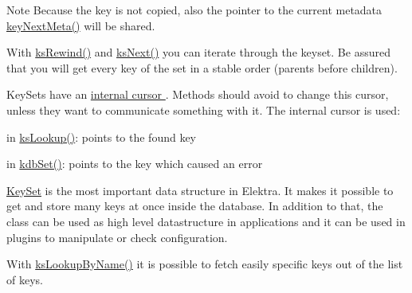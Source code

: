 \begin{DoxyNote}{Note}
Because the key is not copied, also the pointer to the current metadata \hyperlink{group__keymeta_ga4c88342f580a4291455a801af71ce048}{key\+Next\+Meta()} will be shared.
\end{DoxyNote}
With \hyperlink{group__keyset_gabe793ff51f1728e3429c84a8a9086b70}{ks\+Rewind()} and \hyperlink{group__keyset_ga317321c9065b5a4b3e33fe1c399bcec9}{ks\+Next()} you can iterate through the keyset. Be assured that you will get every key of the set in a stable order (parents before children).

Key\+Sets have an \hyperlink{group__keyset_ga4287b9416912c5f2ab9c195cb74fb094}{internal cursor }. Methods should avoid to change this cursor, unless they want to communicate something with it. The internal cursor is used\+:


\begin{DoxyItemize}
\item in \hyperlink{group__keyset_gaa34fc43a081e6b01e4120daa6c112004}{ks\+Lookup()}\+: points to the found key
\item in \hyperlink{group__kdb_ga11436b058408f83d303ca5e996832bcf}{kdb\+Set()}\+: points to the key which caused an error
\end{DoxyItemize}

\hyperlink{classkdb_1_1KeySet}{Key\+Set} is the most important data structure in Elektra. It makes it possible to get and store many keys at once inside the database. In addition to that, the class can be used as high level datastructure in applications and it can be used in plugins to manipulate or check configuration.

With \hyperlink{group__keyset_gad2e30fb6d4739d917c5abb2ac2f9c1a1}{ks\+Lookup\+By\+Name()} it is possible to fetch easily specific keys out of the list of keys.

